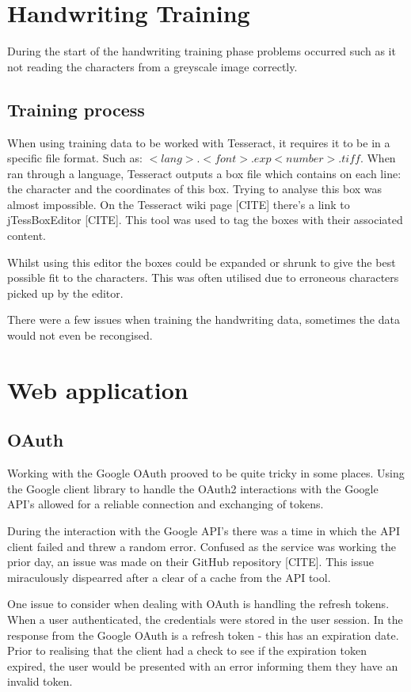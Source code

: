 \section{Handwriting Training}
During the start of the handwriting training phase problems occurred such as it not reading the characters from a greyscale image correctly.
\subsection{Training process}
When using training data to be worked with Tesseract, it requires it to be in a specific file format. Such as: $<lang>.<font>.exp<number>.tiff$. When ran through a language, Tesseract outputs a box file which contains on each line: the character and the coordinates of this box. Trying to analyse this box was almost impossible. On the Tesseract wiki page [CITE] there's a link to jTessBoxEditor [CITE]. This tool was used to tag the boxes with their associated content.

Whilst using this editor the boxes could be expanded or shrunk to give the best possible fit to the characters. This was often utilised due to erroneous characters picked up by the editor.

There were a few issues when training the handwriting data, sometimes the data would not even be recongised.




\section{Web application}

\subsection{OAuth}
Working with the Google OAuth prooved to be quite tricky in some places. Using the Google client library to handle the OAuth2 interactions with the Google API's allowed for a reliable connection and exchanging of tokens.

During the interaction with the Google API's there was a time in which the API client failed and threw a random error. Confused as the service was working the prior day, an issue was made on their GitHub repository [CITE]. This issue miraculously dispearred after a clear of a cache from the API tool.

One issue to consider when dealing with OAuth is handling the refresh tokens. When a user authenticated, the credentials were stored in the user session. In the response from the Google OAuth is a refresh token - this has an expiration date. Prior to realising that the client had a check to see if the expiration token expired, the user would be presented with an error informing them they have an invalid token.

